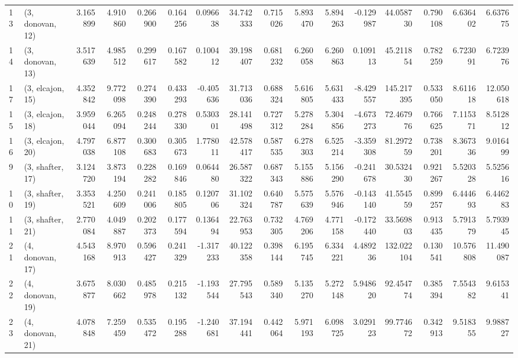 \begin{tabular}{llrrrrrrrrrrrrrr}
13 &  (3, donovan, 12) &  3.165899 &   4.910860 &   0.266900 &  0.164256 &  0.096638 &   34.742333 &  0.715026 &   5.893470 &   5.894263 & -0.129987 &   44.058730 &  0.790108 &   6.636402 &   6.637675 \\
14 &  (3, donovan, 13) &  3.517639 &   4.985512 &   0.299617 &  0.167582 &  0.100412 &   39.198407 &  0.681232 &   6.260058 &   6.260863 &  0.109113 &   45.211854 &  0.782259 &   6.723091 &   6.723976 \\
17 &  (3, elcajon, 15) &  4.352842 &   9.772098 &   0.274390 &  0.433293 & -0.405636 &   31.713036 &  0.688324 &   5.616805 &   5.631433 & -8.429557 &  145.217395 &  0.533050 &   8.611618 &  12.050618 \\
15 &  (3, elcajon, 18) &  3.959044 &   6.265094 &   0.248244 &  0.278330 &  0.530301 &   28.141498 &  0.727312 &   5.278284 &   5.304856 & -4.673273 &   72.467976 &  0.766625 &   7.115371 &   8.512812 \\
16 &  (3, elcajon, 20) &  4.797038 &   6.877108 &   0.300683 &  0.305673 &  1.778011 &   42.578417 &  0.587535 &   6.278303 &   6.525214 & -3.359308 &   81.297259 &  0.738201 &   8.367336 &   9.016499 \\
9  &  (3, shafter, 17) &  3.124720 &   3.873194 &   0.228282 &  0.169846 &  0.064480 &   26.587322 &  0.687343 &   5.155886 &   5.156290 & -0.241678 &   30.532430 &  0.921267 &   5.520328 &   5.525616 \\
10 &  (3, shafter, 19) &  3.353521 &   4.250609 &   0.241006 &  0.185805 &  0.120706 &   31.102324 &  0.640787 &   5.575639 &   5.576946 & -0.143140 &   41.554559 &  0.899257 &   6.444693 &   6.446283 \\
11 &  (3, shafter, 21) &  2.770084 &   4.049887 &   0.202373 &  0.177594 &  0.136494 &   22.763953 &  0.732305 &   4.769206 &   4.771158 & -0.172440 &   33.569803 &  0.913435 &   5.791379 &   5.793945 \\
21 &  (4, donovan, 17) &  4.543168 &   8.970913 &   0.596427 &  0.241329 & -1.317233 &   40.122358 &  0.398144 &   6.195745 &   6.334221 &  4.489236 &  132.022104 &  0.130541 &  10.576808 &  11.490087 \\
22 &  (4, donovan, 19) &  3.675877 &   8.030662 &   0.485978 &  0.215132 & -1.193544 &   27.795543 &  0.589340 &   5.135270 &   5.272148 &  5.948620 &   92.454774 &  0.385394 &   7.554382 &   9.615341 \\
23 &  (4, donovan, 21) &  4.078848 &   7.259459 &   0.535472 &  0.195288 & -1.240681 &   37.194441 &  0.442064 &   5.971193 &   6.098725 &  3.029123 &   99.774672 &  0.342913 &   9.518355 &   9.988727 \\

\end{tabular}
